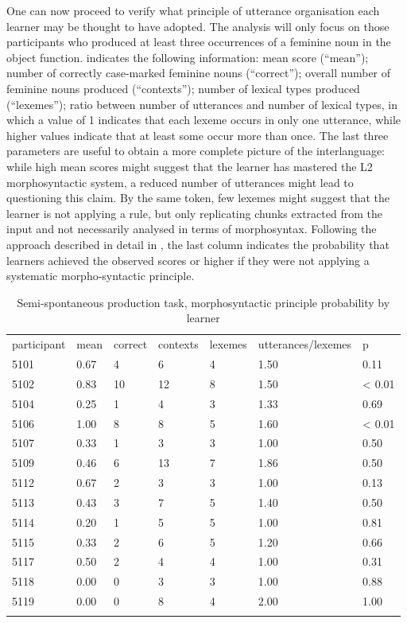 One can now proceed to verify what principle of utterance organisation each learner may be thought to have adopted. The analysis will only focus on those participants who produced at least three occurrences of a feminine noun in the object function.  indicates the following information: mean score (“mean”); number of correctly case-marked feminine nouns (“correct”); overall number of feminine nouns produced (“contexts”); number of lexical types produced (“lexemes”); ratio between number of utterances and number of lexical types, in which a value of 1 indicates that each lexeme occurs in only one utterance, while higher values indicate that at least some occur more than once. The last three parameters are useful to obtain a more complete picture of the interlanguage: while high mean scores might suggest that the learner has mastered the L2 morphosyntactic system, a reduced number of utterances might lead to questioning this claim. By the same token, few lexemes might suggest that the learner is not applying a rule, but only replicating chunks extracted from the input and not necessarily analysed in terms of morphosyntax. Following the approach described in detail in , the last column indicates the probability that learners achieved the observed scores or higher if they were not applying a systematic morpho-syntactic principle.

\begin{table}
    \begin{tabularx}{\textwidth}{XXXXXXX}
        \lsptoprule
         participant & mean & correct & contexts & lexemes & utterances/lexemes & p\\
         5101 & 0.67 & 4 & 6 & 4 & 1.50 & 0.11\\
         5102 & 0.83 & 10 & 12 & 8 & 1.50 & < 0.01\\
         5104 & 0.25 & 1 & 4 & 3 & 1.33 & 0.69\\
         5106 & 1.00 & 8 & 8 & 5 & 1.60 & < 0.01\\
         5107 & 0.33 & 1 & 3 & 3 & 1.00 & 0.50\\
         5109 & 0.46 & 6 & 13 & 7 & 1.86 & 0.50\\
         5112 & 0.67 & 2 & 3 & 3 & 1.00 & 0.13\\
         5113 & 0.43 & 3 & 7 & 5 & 1.40 & 0.50\\
         5114 & 0.20 & 1 & 5 & 5 & 1.00 & 0.81\\
         5115 & 0.33 & 2 & 6 & 5 & 1.20 & 0.66\\
         5117 & 0.50 & 2 & 4 & 4 & 1.00 & 0.31\\
         5118 & 0.00 & 0 & 3 & 3 & 1.00 & 0.88\\
         5119 & 0.00 & 0 & 8 & 4 & 2.00 & 1.00\\
        \lspbottomrule
    \end{tabularx}
    \caption{Semi-spontaneous production task, morphosyntactic principle probability by learner}
    \label{tab:07:5}
\end{table}

